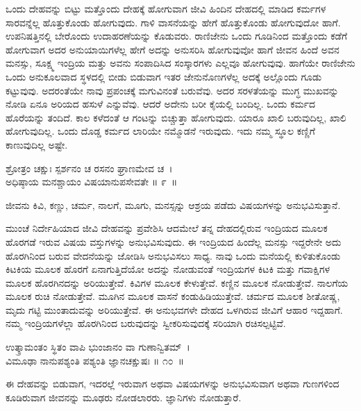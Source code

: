 ಒಂದು ದೇಹವನ್ನು ಬಿಟ್ಟು ಮತ್ತೊಂದು ದೇಹಕ್ಕೆ ಹೋಗುವಾಗ ಜೀವಿ ಹಿಂದಿನ ದೇಹದಲ್ಲಿ ಮಾಡಿದ ಕರ್ಮಗಳ ಸಾರವನ್ನೆಲ್ಲ ಹೊತ್ತುಕೊಂಡು ಹೋಗುವುದು. ಗಾಳಿ ವಾಸನೆಯನ್ನು ಹೇಗೆ ಹೊತ್ತುಕೊಂಡು ಹೋಗುವುದೋ ಹಾಗೆ. ಉಪನಿಷತ್ತಿನಲ್ಲಿ ಬೇರೊಂದು ಉದಾಹರಣೆಯನ್ನು ಕೊಡುವರು. ರಾಣಿಜೇನು ಒಂದು ಗೂಡಿನಿಂದ ಮತ್ತೊಂದು ಕಡೆಗೆ ಹೋಗುವಾಗ ಅದರ ಅನುಯಾಯಿಗಳೆಲ್ಲ ಹೇಗೆ ಅದನ್ನು ಅನುಸರಿಸಿ ಹೋಗುವುವೋ ಹಾಗೆ ಜೀವನ ಹಿಂದೆ ಅವನ ಮನಸ್ಸು, ಸೂಕ್ಷ್ಮ ಇಂದ್ರಿಯ ಮತ್ತು ಅವನು ಸಂಪಾದಿಸಿದ ಸಂಸ್ಕಾರಗಳು ಎಲ್ಲವೂ ಹೋಗುವುವು. ಹಾಗೆಯೇ ರಾಣಿಜೇನು ಒಂದು ಅನುಕೂಲವಾದ ಸ್ಥಳದಲ್ಲಿ ಬೀಡು ಬಿಡುವಾಗ ಇತರ ಜೇನುನೊಣಗಳೆಲ್ಲ ಅದಕ್ಕೆ ಅಲ್ಲೊಂದು ಗೂಡು ಕಟ್ಟುವುವು. ಅದರಂತೆಯೇ ನಾವು ಪ್ರಪಂಚಕ್ಕೆ ಮಗುವಿನಂತೆ ಬರುವೆವು. ಅದರ ಸರಳತೆಯನ್ನು ಮುಗ್ಧ ಮುಖವನ್ನು ನೋಡಿ ಏನೂ ಅರಿಯದ ಹಸುಳೆ ಎನ್ನುವೆವು. ಆದರೆ ಅದೇನು ಬರೀ ಕೈಯಲ್ಲಿ ಬಂದಿಲ್ಲ. ಒಂದು ಕರ್ಮದ ಹೊರೆಯನ್ನು ತಂದಿದೆ. ಕಾಲ ಕಳೆದಂತೆ ಆ ಗಂಟನ್ನು ಬಿಚ್ಚುತ್ತಾ ಹೋಗುವುದು. ಯಾರೂ ಖಾಲಿ ಬರುವುದಿಲ್ಲ, ಖಾಲಿ ಹೋಗುವುದಿಲ್ಲ. ಒಂದು ದೊಡ್ಡ ಕರ್ಮದ ಲಾರಿಯೇ ನಮ್ಮೊಡನೆ ಇರುವುದು. ಇದು ನಮ್ಮ ಸ್ಥೂಲ ಕಣ್ಣಿಗೆ ಕಾಣುವುದಿಲ್ಲ ಅಷ್ಟೇ.

\begin{shloka}
ಶ್ರೋತ್ರಂ ಚಕ್ಷುಃ ಸ್ಪರ್ಶನಂ ಚ ರಸನಂ ಘ್ರಾಣಮೇವ ಚ~।\\ಅಧಿಷ್ಠಾಯ ಮನಶ್ಚಾಯಂ ವಿಷಯಾನುಪಸೇವತೇ \hfill॥ ೯~॥
\end{shloka}

\begin{artha}
ಜೀವನು ಕಿವಿ, ಕಣ್ಣು, ಚರ್ಮ, ನಾಲಗೆ, ಮೂಗು, ಮನಸ್ಸನ್ನು ಆಶ್ರಯ ಪಡೆದು ವಿಷಯಗಳನ್ನು ಅನುಭವಿಸುತ್ತಾನೆ.
\end{artha}

ಮುಂಚೆ ನಿರ್ದೇಹಿಯಾದ ಜೀವಿ ದೇಹವನ್ನು ಪ್ರವೇಶಿಸಿ ಆದಮೇಲೆ ತನ್ನ ದೇಹದಲ್ಲಿರುವ ಇಂದ್ರಿಯದ ಮೂಲಕ ಹೊರಗಡೆ ಇರುವ ವಿಷಯ ವಸ್ತುಗಳನ್ನು ಅನುಭವಿಸುವುದು. ಈ ಇಂದ್ರಿಯದ ಹಿಂದೆಲ್ಲ ಮನಸ್ಸು ಇದ್ದರೇನೇ ಅದು ಹೊರಗಿನಿಂದ ಬರುವ ವೇದನೆಯನ್ನು ಜೋಡಿಸಿ ಅನುಭವಿಸಲು ಸಾಧ್ಯ. ನಾವು ಒಂದು ಮನೆಯಲ್ಲಿ ಕುಳಿತುಕೊಂಡು ಕಿಟಕಿಯ ಮೂಲಕ ಹೊರಗೆ ಏನಾಗುತ್ತಿದೆಯೋ ಅದನ್ನು ನೋಡುವಂತೆ ಇಂದ್ರಿಯಗಳ ಕಿಟಕಿ ಮತ್ತು ಗವಾಕ್ಷಿಗಳ ಮೂಲಕ ಹೊರಗಿನದನ್ನು ಅರಿಯುತ್ತೇವೆ. ಕಿವಿಗಳ ಮೂಲಕ ಕೇಳುತ್ತೇವೆ. ಕಣ್ಣಿನ ಮೂಲಕ ನೋಡುತ್ತೇವೆ. ನಾಲಗೆಯ ಮೂಲಕ ರುಚಿ ನೋಡುತ್ತೇವೆ. ಮೂಗಿನ ಮೂಲಕ ವಾಸನೆ ಕಂಡುಹಿಡಿಯುತ್ತೇವೆ. ಚರ್ಮದ ಮೂಲಕ ಶೀತೋಷ್ಣ, ಮೃದು ಗಟ್ಟಿ ಮುಂತಾದುವನ್ನು ಅರಿಯುತ್ತೇವೆ. ಈ ಅನುಭವಗಳೇ ದೇಹದ ಒಳಗಿರುವ ಜೀವಿಗೆ ಆಹಾರ ಇದ್ದಹಾಗೆ. ನಮ್ಮ ಇಂದ್ರಿಯಗಳೆಲ್ಲಾ ಹೊರಗಿನಿಂದ ಬರುವುದನ್ನು ಸ್ವೀಕರಿಸುವುದಕ್ಕೆ ಸರಿಯಾಗಿ ರಚಿಸಲ್ಪಟ್ಟಿವೆ.

\begin{shloka}
ಉತ್ಕ್ರಾಮಂತಂ ಸ್ಥಿತಂ ವಾಪಿ ಭುಂಜಾನಂ ವಾ ಗುಣಾನ್ವಿತಮ್~।\\ವಿಮೂಢಾ ನಾನುಪಶ್ಯಂತಿ ಪಶ್ಯಂತಿ ಜ್ಞಾನಚಕ್ಷುಷಃ \hfill॥ ೧೦~॥
\end{shloka}

\begin{artha}
ಈ ದೇಹವನ್ನು ಬಿಡುವಾಗ, ಇದರಲ್ಲೆ ಇರುವಾಗ ಅಥವಾ ವಿಷಯಗಳನ್ನು ಅನುಭವಿಸುವಾಗ ಅಥವಾ ಗುಣಗಳಿಂದ ಕೂಡಿರುವಾಗ ಜೀವನನ್ನು ಮೂಢರು ನೋಡಲಾರರು. ಜ್ಞಾನಿಗಳು ನೋಡುತ್ತಾರೆ.
\end{artha}

